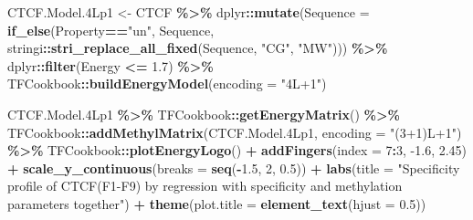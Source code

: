 \documentclass[
]{article}
\newenvironment{Shaded}{\begin{snugshade}}{\end{snugshade}}
\newcommand{\DataTypeTok}[1]{\textcolor[rgb]{0.13,0.29,0.53}{#1}}
\newcommand{\DecValTok}[1]{\textcolor[rgb]{0.00,0.00,0.81}{#1}}
\newcommand{\FloatTok}[1]{\textcolor[rgb]{0.00,0.00,0.81}{#1}}
\newcommand{\KeywordTok}[1]{\textcolor[rgb]{0.13,0.29,0.53}{\textbf{#1}}}
\newcommand{\NormalTok}[1]{#1}
\newcommand{\OperatorTok}[1]{\textcolor[rgb]{0.81,0.36,0.00}{\textbf{#1}}}
\newcommand{\StringTok}[1]{\textcolor[rgb]{0.31,0.60,0.02}{#1}}
\begin{document}
\begin{Shaded}
\begin{Highlighting}[]
\NormalTok{CTCF.Model}\FloatTok{.4}\NormalTok{Lp1 \textless{}{-}}\StringTok{ }\NormalTok{CTCF }\OperatorTok{\%\textgreater{}\%}
\StringTok{  }\NormalTok{dplyr}\OperatorTok{::}\KeywordTok{mutate}\NormalTok{(}\DataTypeTok{Sequence =} \KeywordTok{if\_else}\NormalTok{(Property}\OperatorTok{==}\StringTok{"un"}\NormalTok{,}
\NormalTok{                                   Sequence,}
\NormalTok{                                   stringi}\OperatorTok{::}\KeywordTok{stri\_replace\_all\_fixed}\NormalTok{(Sequence, }\StringTok{"CG"}\NormalTok{, }\StringTok{"MW"}\NormalTok{))) }\OperatorTok{\%\textgreater{}\%}
\StringTok{  }\NormalTok{dplyr}\OperatorTok{::}\KeywordTok{filter}\NormalTok{(Energy }\OperatorTok{\textless{}=}\StringTok{ }\FloatTok{1.7}\NormalTok{) }\OperatorTok{\%\textgreater{}\%}
\StringTok{  }\NormalTok{TFCookbook}\OperatorTok{::}\KeywordTok{buildEnergyModel}\NormalTok{(}\DataTypeTok{encoding =} \StringTok{"4L+1"}\NormalTok{)}
  
\NormalTok{CTCF.Model}\FloatTok{.4}\NormalTok{Lp1 }\OperatorTok{\%\textgreater{}\%}
\StringTok{  }\NormalTok{TFCookbook}\OperatorTok{::}\KeywordTok{getEnergyMatrix}\NormalTok{() }\OperatorTok{\%\textgreater{}\%}
\StringTok{  }\NormalTok{TFCookbook}\OperatorTok{::}\KeywordTok{addMethylMatrix}\NormalTok{(CTCF.Model}\FloatTok{.4}\NormalTok{Lp1, }\DataTypeTok{encoding =} \StringTok{"(3+1)L+1"}\NormalTok{) }\OperatorTok{\%\textgreater{}\%}
\StringTok{  }\NormalTok{TFCookbook}\OperatorTok{::}\KeywordTok{plotEnergyLogo}\NormalTok{() }\OperatorTok{+}
\StringTok{  }\KeywordTok{addFingers}\NormalTok{(}\DataTypeTok{index =} \DecValTok{7}\OperatorTok{:}\DecValTok{3}\NormalTok{, }\FloatTok{{-}1.6}\NormalTok{, }\FloatTok{2.45}\NormalTok{) }\OperatorTok{+}
\StringTok{  }\KeywordTok{scale\_y\_continuous}\NormalTok{(}\DataTypeTok{breaks =} \KeywordTok{seq}\NormalTok{(}\OperatorTok{{-}}\FloatTok{1.5}\NormalTok{, }\DecValTok{2}\NormalTok{, }\FloatTok{0.5}\NormalTok{)) }\OperatorTok{+}
\StringTok{  }\KeywordTok{labs}\NormalTok{(}\DataTypeTok{title =} \StringTok{"Specificity profile of CTCF(F1{-}F9) }
\StringTok{       by regression with specificity and methylation parameters together"}\NormalTok{) }\OperatorTok{+}
\StringTok{  }\KeywordTok{theme}\NormalTok{(}\DataTypeTok{plot.title =} \KeywordTok{element\_text}\NormalTok{(}\DataTypeTok{hjust =} \FloatTok{0.5}\NormalTok{))}
\end{Highlighting}
\end{Shaded}
\end{document}
